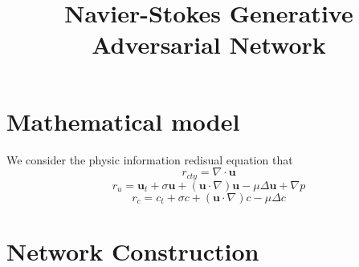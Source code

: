 \documentclass[12pt]{article} %
\newcommand{\bu}{\bm{u}}
\begin{document}
\title{Navier-Stokes Generative Adversarial Network}
\date{}
\maketitle
\section{Mathematical model}
We consider the physic information redisual equation that
\begin{equation}
    r_{cty} = \nabla \cdot \bu
\end{equation}
\begin{equation}
    r_{u} = \bu_t + \sigma \bu + (\bu \cdot \nabla)\bu  - \mu\Delta\bu + \nabla p
\end{equation}
\begin{equation}
    r_{c} = c_t + \sigma c + (\bu \cdot \nabla)c - \mu\Delta c
\end{equation}


\section{Network Construction}




\end{document}
